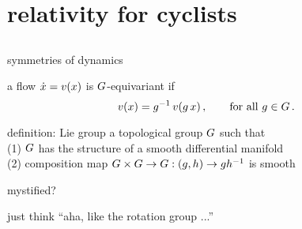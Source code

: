 \section[relativity for cyclists]{relativity for cyclists}

\subsection[in/equivariance]{}

\begin{frame}{symmetries of dynamics}
\begin{block}{a flow $\dot{x}= v(x)$ is $G$-equivariant if}
\[
v(x)=g^{-1} \, v(g \, x)
\,,\qquad \mbox{for all } g \in {\ensuremath{G}}
\,.
\] %
\end{block}

\bigskip
\begin{block}{definition: Lie group}
a topological group $G$ such that
\\
     (1) $G$ has the structure of a smooth differential manifold
\\
     (2) composition map
     $G \times G \to G: (g,h) \to g h^{-1}$ is smooth
\end{block}


\bigskip
mystified?

\bigskip
just think
``aha, like the rotation group ...''
\end{frame}

